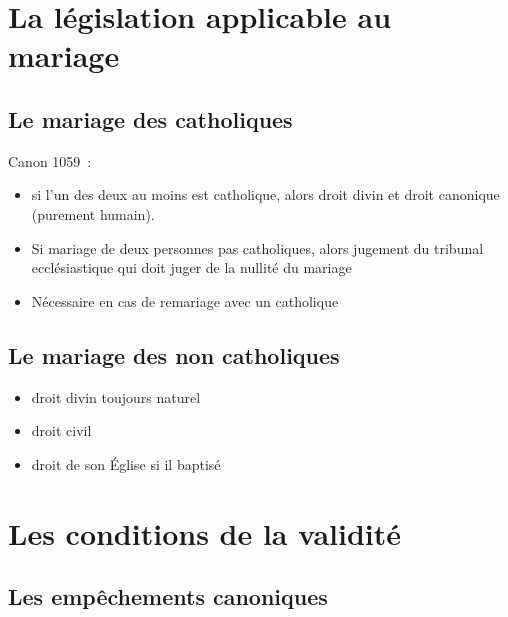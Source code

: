 \hypertarget{ii.-la-luxe9gislation-applicable-au-mariage}{%
\section{La législation applicable au
mariage}\label{ii.-la-luxe9gislation-applicable-au-mariage}}

\hypertarget{le-mariage-des-catholiques}{%
\subsection{Le mariage des
catholiques}\label{le-mariage-des-catholiques}}

Canon 1059~:

\begin{itemize}
\item
  si l'un des deux au moins est catholique, alors droit divin et
  droit canonique (purement humain).
\item
  Si mariage de deux personnes pas catholiques, alors jugement du
  tribunal ecclésiastique qui doit juger de la nullité du mariage
\item
   
  Nécessaire en cas de remariage avec un catholique
   
\end{itemize}

\hypertarget{le-mariage-des-non-catholiques}{%
\subsection{Le mariage des non
catholiques}\label{le-mariage-des-non-catholiques}}

\begin{itemize}
\item
  droit divin toujours naturel
\item
  droit civil
\item
  droit de son Église si il baptisé
\end{itemize}

\hypertarget{iii.-les-conditions-de-la-validituxe9}{%
\section{Les conditions de la
validité}\label{iii.-les-conditions-de-la-validituxe9}}

\hypertarget{les-empuxeachements-canoniques}{%
\subsection{Les empêchements
canoniques}\label{les-empuxeachements-canoniques}}

